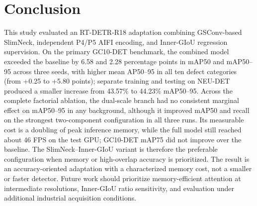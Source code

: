 \documentclass[pdflatex,sn-mathphys-num,iicol]{sn-jnl}
\begin{document}
\section{Conclusion}\label{sec:conclusion}

This study evaluated an RT-DETR-R18 adaptation combining GSConv-based SlimNeck, independent P4/P5 AIFI encoding, and Inner-GIoU regression supervision. On the primary GC10-DET benchmark, the combined model exceeded the baseline by 6.58 and 2.28 percentage points in mAP50 and mAP50--95 across three seeds, with higher mean AP50--95 in all ten defect categories (from +0.25 to +5.80 points); separate training and testing on NEU-DET produced a smaller increase from 43.57\% to 44.23\% mAP50--95. Across the complete factorial ablation, the dual-scale branch had no consistent marginal effect on mAP50--95 in any background, although it improved mAP50 and recall on the strongest two-component configuration in all three runs. Its measurable cost is a doubling of peak inference memory, while the full model still reached about 46 FPS on the test GPU; GC10-DET mAP75 did not improve over the baseline. The SlimNeck--Inner-GIoU variant is therefore the preferable configuration when memory or high-overlap accuracy is prioritized. The result is an accuracy-oriented adaptation with a characterized memory cost, not a smaller or faster detector. Future work should prioritize memory-efficient attention at intermediate resolutions, Inner-GIoU ratio sensitivity, and evaluation under additional industrial acquisition conditions.

\backmatter
\end{document}
